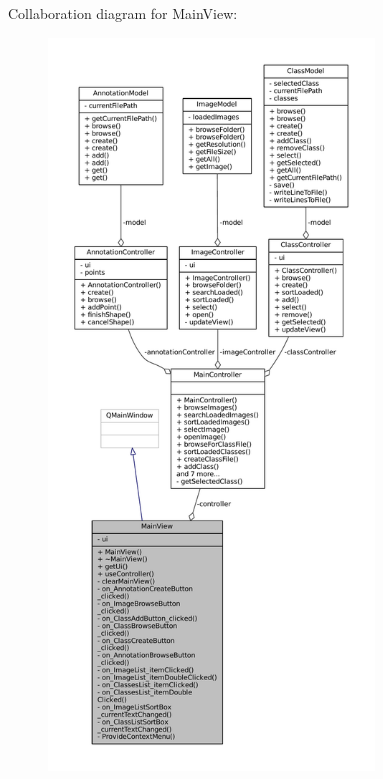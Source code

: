 Collaboration diagram for Main\+View\+:
\nopagebreak
\begin{figure}[H]
\begin{center}
\leavevmode
\includegraphics[height=550pt]{classMainView__coll__graph}
\end{center}
\end{figure}
